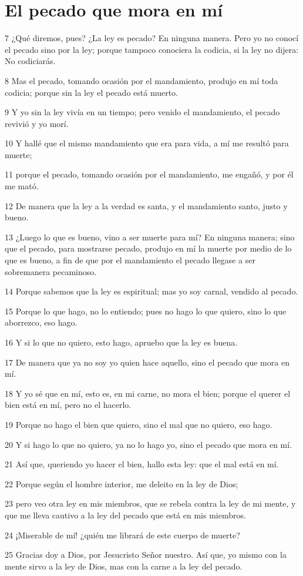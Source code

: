 \section*{El pecado que mora en mí}

\par 7 ¿Qué diremos, pues? ¿La ley es pecado? En ninguna manera. Pero yo no conocí el pecado sino por la ley; porque tampoco conociera la codicia, si la ley no dijera: No codiciarás.
\par 8 Mas el pecado, tomando ocasión por el mandamiento, produjo en mí toda codicia; porque sin la ley el pecado está muerto.
\par 9 Y yo sin la ley vivía en un tiempo; pero venido el mandamiento, el pecado revivió y yo morí.
\par 10 Y hallé que el mismo mandamiento que era para vida, a mí me resultó para muerte;
\par 11 porque el pecado, tomando ocasión por el mandamiento, me engañó, y por él me mató.
\par 12 De manera que la ley a la verdad es santa, y el mandamiento santo, justo y bueno.
\par 13 ¿Luego lo que es bueno, vino a ser muerte para mí? En ninguna manera; sino que el pecado, para mostrarse pecado, produjo en mí la muerte por medio de lo que es bueno, a fin de que por el mandamiento el pecado llegase a ser sobremanera pecaminoso.
\par 14 Porque sabemos que la ley es espiritual; mas yo soy carnal, vendido al pecado.
\par 15 Porque lo que hago, no lo entiendo; pues no hago lo que quiero, sino lo que aborrezco, eso hago.
\par 16 Y si lo que no quiero, esto hago, apruebo que la ley es buena.
\par 17 De manera que ya no soy yo quien hace aquello, sino el pecado que mora en mí.
\par 18 Y yo sé que en mí, esto es, en mi carne, no mora el bien; porque el querer el bien está en mí, pero no el hacerlo.
\par 19 Porque no hago el bien que quiero, sino el mal que no quiero, eso hago.
\par 20 Y si hago lo que no quiero, ya no lo hago yo, sino el pecado que mora en mí.
\par 21 Así que, queriendo yo hacer el bien, hallo esta ley: que el mal está en mí.
\par 22 Porque según el hombre interior, me deleito en la ley de Dios;
\par 23 pero veo otra ley en mis miembros, que se rebela contra la ley de mi mente, y que me lleva cautivo a la ley del pecado que está en mis miembros.
\par 24 ¡Miserable de mí! ¿quién me librará de este cuerpo de muerte?
\par 25 Gracias doy a Dios, por Jesucristo Señor nuestro. Así que, yo mismo con la mente sirvo a la ley de Dios, mas con la carne a la ley del pecado.

